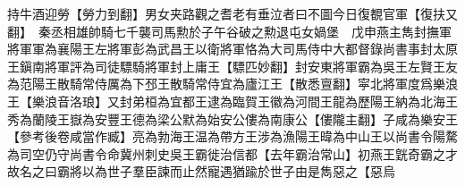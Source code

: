 持牛酒迎勞【勞力到翻】男女夹路觀之耆老有垂泣者曰不圖今日復覩官軍【復扶又翻】　秦丞相雄帥騎七千襲司馬勲於子午谷破之勲退屯女媧堡　戊申燕主雋封撫軍將軍軍為襄陽王左將軍彭為武昌王以衛將軍恪為大司馬侍中大都督錄尚書事封太原王鎭南將軍評為司徒驃騎將軍封上庸王【驃匹妙翻】封安東將軍霸為吳王左賢王友為范陽王散騎常侍厲為下邳王散騎常侍宜為廬江王【散悉亶翻】寜北將軍度爲樂浪王【樂浪音洛琅】又封弟桓為宜都王逮為臨賀王徽為河間王龍為歷陽王納為北海王秀為蘭陵王嶽為安豐王德為梁公默為始安公僂為南康公【僂隴主翻】子咸為樂安王【參考後卷咸當作臧】亮為勃海王温為帶方王涉為漁陽王暐為中山王以尚書令陽騖為司空仍守尚書令命冀州刺史吳王霸徙治信都【去年霸治常山】初燕王皝奇霸之才故名之曰霸將以為世子羣臣諫而止然寵遇猶踰於世子由是雋惡之【惡烏